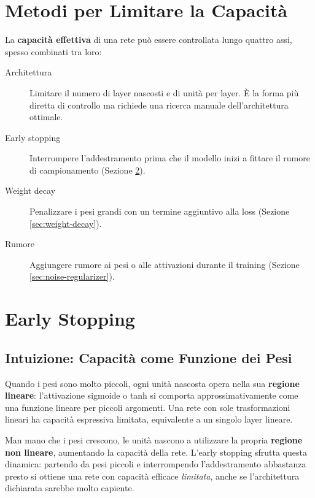 \section{Metodi per Limitare la Capacità}
\label{sec:limit-capacity}

La \textbf{capacità effettiva} di una rete può essere controllata lungo
quattro assi, spesso combinati tra loro:

\begin{description}
  \item[Architettura] Limitare il numero di layer nascosti e di unità per layer.
        È la forma più diretta di controllo ma richiede una ricerca manuale
        dell'architettura ottimale.
  \item[Early stopping] Interrompere l'addestramento prima che il modello
        inizi a fittare il rumore di campionamento (Sezione
        \ref{sec:early-stopping}).
  \item[Weight decay] Penalizzare i pesi grandi con un termine aggiuntivo
        alla loss (Sezione \ref{sec:weight-decay}).
  \item[Rumore] Aggiungere rumore ai pesi o alle attivazioni durante il
        training (Sezione \ref{sec:noise-regularizer}).
\end{description}

\section{Early Stopping}
\label{sec:early-stopping}

\subsection{Intuizione: Capacità come Funzione dei Pesi}
\label{subsec:early-stopping-intuition}

Quando i pesi sono molto piccoli, ogni unità nascosta opera nella sua
\textbf{regione lineare}: l'attivazione sigmoide o tanh si comporta
approssimativamente come una funzione lineare per piccoli argomenti. Una
rete con sole trasformazioni lineari ha capacità espressiva limitata,
equivalente a un singolo layer lineare.

Man mano che i pesi crescono, le unità nascono a utilizzare la propria
\textbf{regione non lineare}, aumentando la capacità della rete. L'early
stopping sfrutta questa dinamica: partendo da pesi piccoli e interrompendo
l'addestramento abbastanza presto si ottiene una rete con capacità
efficace \emph{limitata}, anche se l'architettura dichiarata sarebbe molto
capiente.

